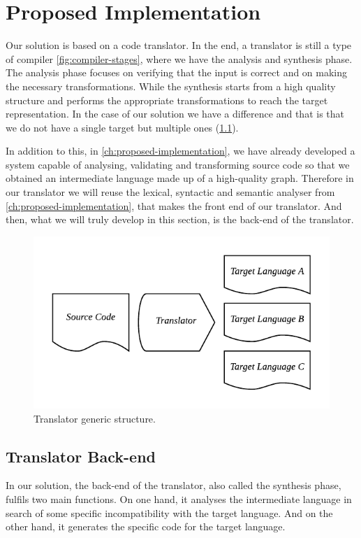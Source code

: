 \chapter{Proposed Implementation}
\label{ch:proposed-system}

Our solution is based on a code translator. In the end, a translator is still a type of compiler \cref{fig:compiler-stages},
where we have the analysis and synthesis phase. The analysis phase focuses on verifying that the input is correct and on
making the necessary transformations. While the synthesis starts from a high quality structure and performs the
appropriate transformations to reach the target representation. In the case of our solution we have a difference
and that is that we do not have a single target but multiple ones (\cref{fig:translator}).

In addition to this, in \cref{ch:proposed-implementation}, we have already developed a system capable of analysing,
validating and transforming source code so that we obtained an intermediate language made up of a
high-quality graph. Therefore in our translator we will reuse the lexical, syntactic and semantic
analyser from \cref{ch:proposed-implementation}, that makes the front end of our translator.
And then, what we will truly develop in this section, is the back-end of the translator.

\begin{figure}
    \includegraphics{images/translator.pdf}
    \centering
	\caption[Translator generic structure]{Translator generic structure.}
    \label{fig:translator}
\end{figure}

\section{Translator Back-end}
In our solution, the back-end of the translator, also called the synthesis phase,
fulfils two main functions. On one hand, it analyses the intermediate language
in search of some specific incompatibility with the target language. And on the
other hand, it generates the specific code for the target language.

